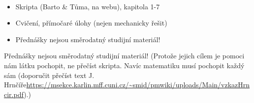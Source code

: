 \documentclass[12pt]{article}					%
\begin{document}
    \begin{poznamka}[Materiály]
        \ 
        \begin{itemize}
            \item Skripta (Barto \& Tůma, na webu), kapitola 1-7
            \item Cvičení, přímočaré úlohy (nejen mechanicky řešit)
            \item Přednášky nejsou směrodatný studijní materiál!
        \end{itemize}
        \begin{upozorneni}
                Přednášky nejsou směrodatný studijní materiál! (Protože jejich cílem je pomoci nám látku pochopit, ne přečíst skripta. Navíc matematiku musí pochopit každý sám (doporučit přečíst text J. Hrnčíře\url{https://msekce.karlin.mff.cuni.cz/~smid/pmwiki/uploads/Main/vzkazHrncir.pdf}).)
        \end{upozorneni}
    \end{poznamka}
\end{document}
